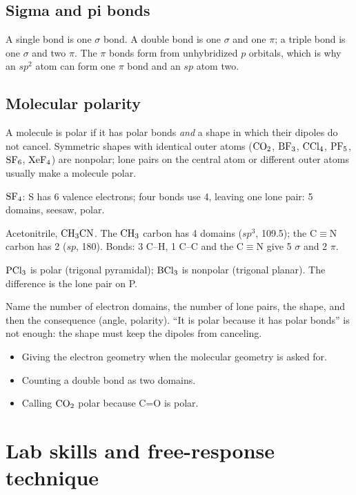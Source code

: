 \documentclass[11pt]{article}
\begin{document}
\subsection{Sigma and pi bonds}
A single bond is one $\sigma$ bond. A double bond is one $\sigma$ and one $\pi$; a triple bond is one $\sigma$ and two $\pi$. The $\pi$ bonds form from unhybridized $p$ orbitals, which is why an $sp^2$ atom can form one $\pi$ bond and an $sp$ atom two.
\subsection{Molecular polarity}
A molecule is polar if it has polar bonds \emph{and} a shape in which their dipoles do not cancel. Symmetric shapes with identical outer atoms ($\ce{CO2}$, $\ce{BF3}$, $\ce{CCl4}$, $\ce{PF5}$, $\ce{SF6}$, $\ce{XeF4}$) are nonpolar; lone pairs on the central atom or different outer atoms usually make a molecule polar.

 $\ce{SF4}$: S has 6 valence electrons; four bonds use 4, leaving one lone pair: 5 domains, seesaw, polar.

 Acetonitrile, $\ce{CH3CN}$. The $\ce{CH3}$ carbon has 4 domains ($sp^3$, 109.5\textdegree); the C$\equiv$N carbon has 2 ($sp$, 180\textdegree). Bonds: 3 C--H, 1 C--C and the C$\equiv$N give 5 $\sigma$ and 2 $\pi$.

 $\ce{PCl3}$ is polar (trigonal pyramidal); $\ce{BCl3}$ is nonpolar (trigonal planar). The difference is the lone pair on P.

\frph Name the number of electron domains, the number of lone pairs, the shape, and then the consequence (angle, polarity). ``It is polar because it has polar bonds'' is not enough: the shape must keep the dipoles from canceling.

\errorsh
\begin{itemize}
\item Giving the electron geometry when the molecular geometry is asked for.
\item Counting a double bond as two domains.
\item Calling $\ce{CO2}$ polar because C=O is polar.
\end{itemize}

\section{Lab skills and free-response technique}\label{t:lab}
\end{document}
